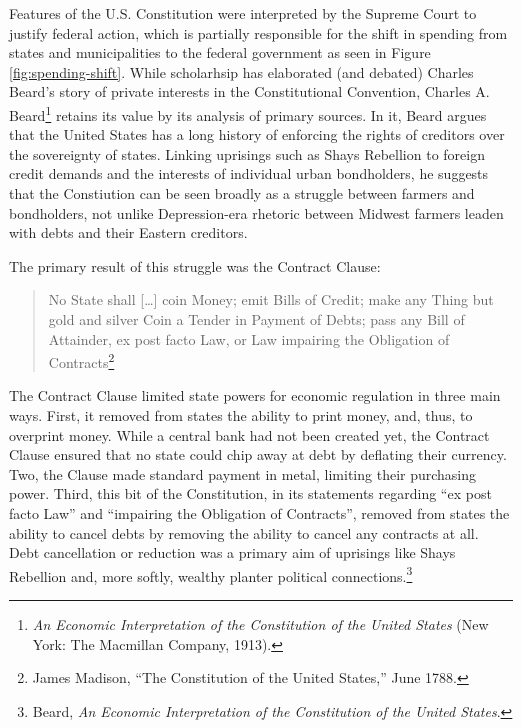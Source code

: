 \documentclass[12pt,oneside]{psthesis}
\begin{document}
Features of the U.S. Constitution were interpreted by the Supreme Court to justify federal action, which is partially responsible for the shift in spending from states and municipalities to the federal government as seen in Figure \ref{fig:spending-shift}.
While scholarhsip has elaborated (and debated) Charles Beard's story of private interests in the Constitutional Convention, Charles A. Beard\footnote{\emph{An Economic Interpretation of the Constitution of the United States} (New York: The Macmillan Company, 1913).} retains its value by its analysis of primary sources.
In it, Beard argues that the United States has a long history of enforcing the rights of creditors over the sovereignty of states.
Linking uprisings such as Shays Rebellion to foreign credit demands and the interests of individual urban bondholders, he suggests that the Constiution can be seen broadly as a struggle between farmers and bondholders, not unlike Depression-era rhetoric between Midwest farmers leaden with debts and their Eastern creditors.

The primary result of this struggle was the Contract Clause:
\begin{quote}
No State shall {[}\ldots{]} coin Money; emit Bills of Credit; make any Thing but gold and silver Coin a Tender in Payment of Debts; pass any Bill of Attainder, ex post facto Law, or Law impairing the Obligation of Contracts\footnote{James Madison, ``The Constitution of the United States,'' June 1788.}
\end{quote}
The Contract Clause limited state powers for economic regulation in three main ways.
First, it removed from states the ability to print money, and, thus, to overprint money.
While a central bank had not been created yet, the Contract Clause ensured that no state could chip away at debt by deflating their currency.
Two, the Clause made standard payment in metal, limiting their purchasing power.
Third, this bit of the Constitution, in its statements regarding ``ex post facto Law'' and ``impairing the Obligation of Contracts'', removed from states the ability to cancel debts by removing the ability to cancel any contracts at all.
Debt cancellation or reduction was a primary aim of uprisings like Shays Rebellion and, more softly, wealthy planter political connections.\footnote{Beard, \emph{An Economic Interpretation of the Constitution of the United States}.}
\end{document}
